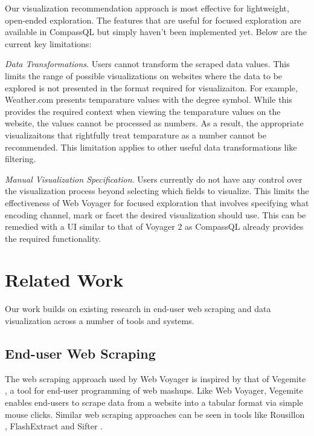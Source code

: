 \documentclass{vgtc}                          %
\begin{document}
Our visualization recommendation approach is most effective for
lightweight, open-ended exploration. The features that are useful for
focused exploration are available in CompassQL but simply haven't been implemented yet.
Below are the current key limitations:

\emph{Data Transformations}. Users cannot transform the scraped data values. This limits the range of possible visualizations on
websites where the data to be explored is not presented in the format required for visualizaiton. For example, Weather.com presents
temparature values with the degree symbol. While this provides the required context when viewing the temparature values on the website, the
values cannot be processed as numbers. As a result, the appropriate visualizaitons that rightfully treat temparature as a number cannot be recommended.
This limitation applies to other useful data transformations like filtering.

\emph{Manual Visualization Specification}. Users currently do not have any control over the visualization process
beyond selecting which fields to visualize. This limits the
effectiveness of Web Voyager for focused exploration that involves
specifying what encoding channel, mark or facet the desired
visualization should use. This can be remedied with a UI similar to that
of Voyager 2 \cite{wongsuphasawat2017} as CompassQL \cite{wongsuphasawat2016} already provides the required functionality.

\section{Related Work} \label{related-work}

Our work builds on existing research in end-user web scraping and data
visualization across a number of tools and systems.

\subsection{End-user Web Scraping}

The web scraping approach used by Web Voyager is inspired by that of
Vegemite \cite{lin2009}, a tool for end-user programming of web
mashups. Like Web Voyager, Vegemite enables end-users to scrape data
from a website into a tabular format via simple mouse clicks. Similar
web scraping approaches can be seen in tools like Rousillon
\cite{chasins2018}, FlashExtract \cite{le2014} and Sifter \cite{huynh2006}.
\end{document}
